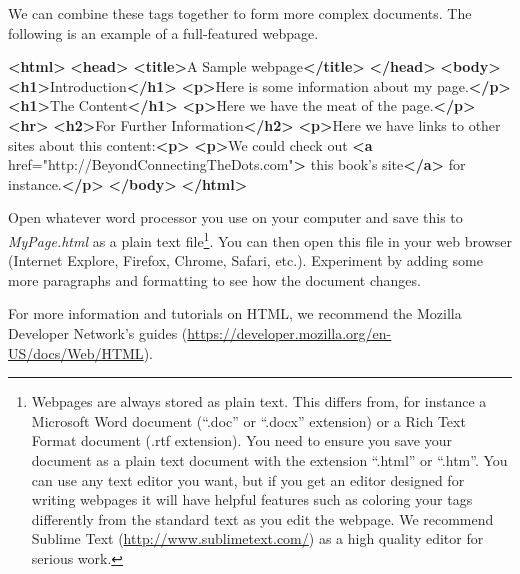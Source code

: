 \documentclass[]{memoir}
\newenvironment{Shaded}{}{}
\newcommand{\KeywordTok}[1]{\textcolor[rgb]{0.00,0.44,0.13}{\textbf{{#1}}}}
\newcommand{\StringTok}[1]{\textcolor[rgb]{0.25,0.44,0.63}{{#1}}}
\newcommand{\OtherTok}[1]{\textcolor[rgb]{0.00,0.44,0.13}{{#1}}}
\newcommand{\NormalTok}[1]{{#1}}
\begin{document}
We can combine these tags together to form more complex documents. The
following is an example of a full-featured webpage.

\begin{Shaded}
\begin{Highlighting}[]
\KeywordTok{<html>}
\KeywordTok{<head>}
    \KeywordTok{<title>}\NormalTok{A Sample webpage}\KeywordTok{</title>}
\KeywordTok{</head>}
\KeywordTok{<body>}
    \KeywordTok{<h1>}\NormalTok{Introduction}\KeywordTok{</h1>}
        \KeywordTok{<p>}\NormalTok{Here is some information about my page.}\KeywordTok{</p>}
    \KeywordTok{<h1>}\NormalTok{The Content}\KeywordTok{</h1>}
        \KeywordTok{<p>}\NormalTok{Here we have the meat of the page.}\KeywordTok{</p>}
    \KeywordTok{<hr>}
    \KeywordTok{<h2>}\NormalTok{For Further Information}\KeywordTok{</h2>}
        \KeywordTok{<p>}\NormalTok{Here we have links to other sites about this content:}\KeywordTok{<p>}
        \KeywordTok{<p>}\NormalTok{We could check out }\KeywordTok{<a}\OtherTok{ href=}\StringTok{"http://BeyondConnectingTheDots.com"}\KeywordTok{>}
            \NormalTok{this book's site}\KeywordTok{</a>} \NormalTok{for instance.}\KeywordTok{</p>}
\KeywordTok{</body>}
\KeywordTok{</html>}
\end{Highlighting}
\end{Shaded}

Open whatever word processor you use on your computer and save this to
\emph{MyPage.html} as a plain text file\footnote{Webpages are always
  stored as plain text. This differs from, for instance a Microsoft Word
  document (``.doc'' or ``.docx'' extension) or a Rich Text Format
  document (.rtf extension). You need to ensure you save your document
  as a plain text document with the extension ``.html'' or ``.htm''. You
  can use any text editor you want, but if you get an editor designed
  for writing webpages it will have helpful features such as coloring
  your tags differently from the standard text as you edit the webpage.
  We recommend Sublime Text (\url{http://www.sublimetext.com/}) as a
  high quality editor for serious work.}. You can then open this file in
your web browser (Internet Explore, Firefox, Chrome, Safari, etc.).
Experiment by adding some more paragraphs and formatting to see how the
document changes.

For more information and tutorials on HTML, we recommend the Mozilla
Developer Network's guides
(\url{https://developer.mozilla.org/en-US/docs/Web/HTML}).

\end{document}
